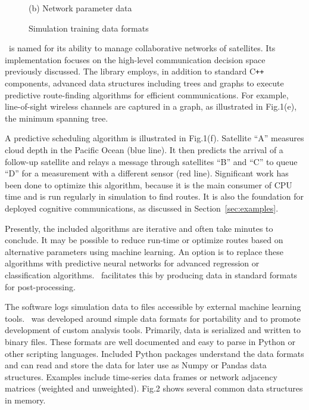 \documentclass[conference]{IEEEtran}
\newcommand{\project}{{\sc{Collaborate}}~}
\newcommand{\cpp}{C\texttt{++}~}
\begin{document}
\begin{figure}[t]
\begin{minipage}[b]{0.49\linewidth}
\begin{center}
      {\footnotesize(b) Network parameter data}
    \end{center}
  \end{minipage}
  \caption{Simulation training data formats}
  \label{fig:data}
\end{figure}

\project is named for its ability to manage collaborative networks of
satellites.  Its implementation focuses on the high-level communication decision
space previously discussed.  The library employs, in addition to standard \cpp
components, advanced data structures including trees and graphs to execute
predictive route-finding algorithms for efficient communications.  For example,
line-of-sight wireless channels are captured in a graph, as illustrated in
Fig.1(e), the minimum spanning tree.

A predictive scheduling algorithm is illustrated in Fig.1(f).  Satellite ``A''
measures cloud depth in the Pacific Ocean (blue line).  It then predicts the
arrival of a follow-up satellite and relays a message through satellites ``B''
and ``C'' to queue ``D'' for a measurement with a different sensor (red line).
Significant work has been done to optimize this algorithm, because it is the
main consumer of CPU time and is run regularly in simulation to find routes.  It
is also the foundation for deployed cognitive communications, as discussed in
Section~\ref{sec:examples}.

Presently, the included algorithms are iterative and often take minutes to
conclude.  It may be possible to reduce run-time or optimize routes based on
alternative parameters using machine learning.  An option is to replace these
algorithms with predictive neural networks for advanced regression or
classification algorithms.  \project facilitates this by producing data in
standard formats for post-processing.

The software logs simulation data to files accessible by external machine
learning tools.  \project was developed around simple data formats for
portability and to promote development of custom analysis tools.  Primarily,
data is serialized and written to binary files.  These formats are well
documented and easy to parse in Python or other scripting languages.  Included
Python packages understand the data formats and can read and store the data for
later use as Numpy or Pandas data structures.  Examples include time-series data
frames or network adjacency matrices (weighted and unweighted).  Fig.2 shows
several common data structures in memory.
\end{document}

